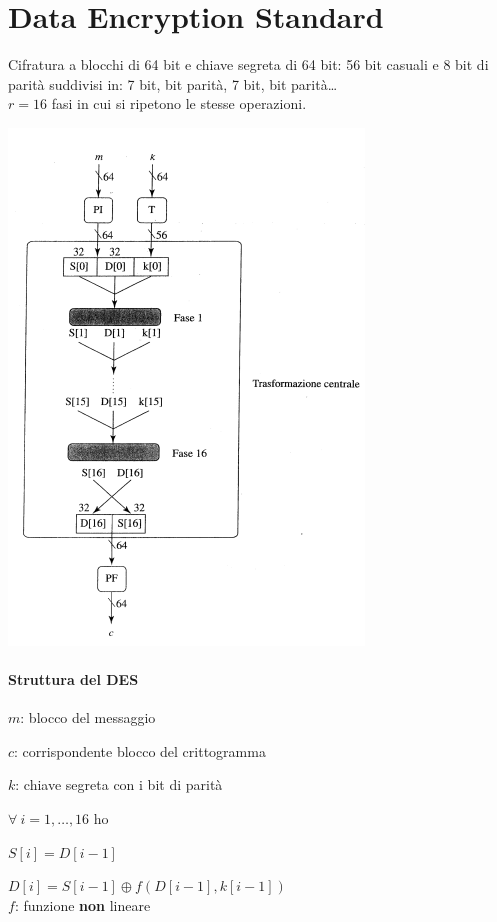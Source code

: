 \documentclass[10pt]{book}
\begin{document}
\section{Data Encryption Standard}
Cifratura a blocchi di 64 bit e chiave segreta di 64 bit: 56 bit casuali e 8 bit di parità suddivisi in: 7 bit, bit parità, 7 bit, bit parità\ldots\\
$r = 16$ fasi in cui si ripetono le stesse operazioni.
\begin{multicols}{2}
	\begin{center}
		\includegraphics[scale=0.75]{8.png}
	\end{center}
	\columnbreak
	\paragraph{Struttura del DES}
	\begin{list}{}{}
		\item $m$: blocco del messaggio
		\item $c$: corrispondente blocco del crittogramma
		\item $k$: chiave segreta con i bit di parità
		\item
		\item $\forall\:i=1,\ldots,16$ ho
		\begin{list}{}{}
			\item $S[i] = D[i-1]$
			\item $D[i] = S[i-1]\oplus f(D[i-1], k[i-1])$\\
			$f$: funzione \textbf{non} lineare
		\end{list}
	\end{list}
\end{multicols}
\pagebreak
\end{document}
